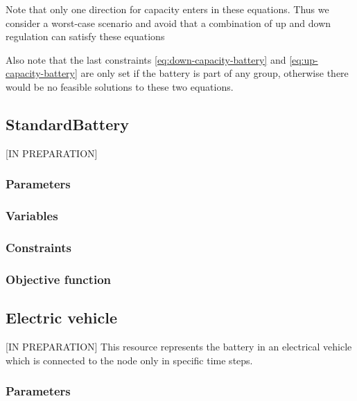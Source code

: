 \documentclass[]{report}
\newcommand{\groups}{\mathcal{G}}
\begin{document}
Note that only one direction for capacity enters in these equations. Thus we consider a worst-case scenario and avoid that a combination of up and down regulation can satisfy these equations

Also note that the last constraints \ref{eq:down-capacity-battery} and \ref{eq:up-capacity-battery} are only set if the battery is part of any group, otherwise there would be no feasible solutions to these two equations.



\newpage
\subsection{StandardBattery}

[IN PREPARATION]

\subsubsection*{Parameters}


\subsubsection*{Variables}
\subsubsection*{Constraints}
\subsubsection*{Objective function}

\newpage
\subsection{Electric vehicle}
[IN PREPARATION]
This resource represents the battery in an electrical vehicle which is connected to the node only in specific time steps.

\subsubsection*{Parameters}
\end{document}
